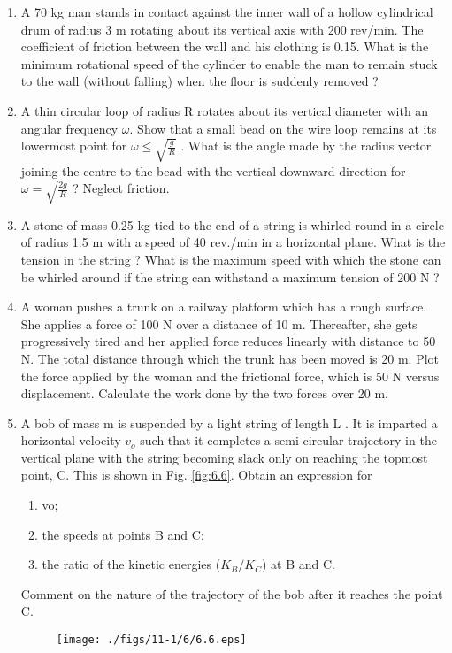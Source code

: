 \begin{enumerate}[label=\arabic*.,ref=\thesubsection.\theenumi]
\item A 70 kg man stands in contact against the inner wall of a hollow cylindrical drum of radius 3 m rotating about its vertical axis with 200 rev/min. The coefficient of friction between the wall and his clothing is 0.15. What is the minimum rotational speed of the cylinder to enable the man to remain stuck to the wall (without falling) when the floor is suddenly removed ?
\item A thin circular loop of radius R rotates about its vertical diameter with an angular frequency $\omega$. Show that a small bead on the wire loop remains at its lowermost point for $\omega \le \sqrt{\frac{g}{R}}$ . What is the angle made by the radius vector joining the centre to the bead with the vertical downward direction for $\omega = \sqrt{\frac{2g}{R}}$  ? Neglect friction.
\item A stone of mass 0.25 kg tied to the end of a string is whirled round in a circle of radius 1.5 m with a speed of 40 rev./min in a horizontal plane. What is the tension in the string ? What is the maximum speed with which the stone can be whirled around if the string can withstand a maximum tension of 200 N ?
\item A woman pushes a trunk on a railway platform which has a rough surface. She applies a force of 100 N over a distance of 10 m. Thereafter, she gets progressively tired and her applied force reduces linearly with distance to 50 N. The total distance through which the trunk has been moved is 20 m. Plot the force applied by the woman and the frictional force, which is 50 N versus displacement. Calculate the work done by the two forces over 20 m.
\item A bob of mass m is suspended by a light string of length L . It is imparted a horizontal velocity $v_o$
such that it completes a semi-circular trajectory in the vertical plane with the string becoming slack only on reaching the topmost point, C. This is shown in Fig. \ref{fig:6.6}. Obtain an expression for 
\begin{enumerate}
\item  vo; 
\item  the speeds at points B and C; 
\item  the ratio of the kinetic energies ($K_B/K_C$) at B and C. 
\end{enumerate}
Comment on the nature
of the trajectory of the bob after it reaches the point C.
\begin{figure}[!ht]
\texttt{[image: ./figs/11-1/6/6.6.eps]}

\end{figure}
\end{enumerate}
